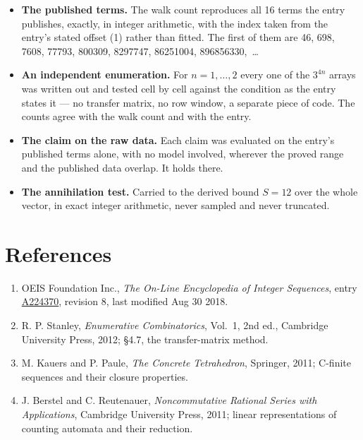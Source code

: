 \documentclass[11pt]{article}
\theoremstyle{definition}
\begin{document}
\begin{itemize}

\item {\bfseries The published terms.} The walk count reproduces all 16 terms the entry publishes, exactly, in integer arithmetic, with the index taken from the entry's stated offset (1) rather than fitted. The first of them are 46, 698, 7608, 77793, 800309, 8297747, 86251004, 896856330,~\dots

\item {\bfseries An independent enumeration.} For $n = 1,\dots,2$ every one of the $3^{4n}$ arrays was written out and tested cell by cell against the condition as the entry states it --- no transfer matrix, no row window, a separate piece of code. The counts agree with the walk count and with the entry.

\item {\bfseries The claim on the raw data.} Each claim was evaluated on the entry's published terms alone, with no model involved, wherever the proved range and the published data overlap. It holds there.

\item {\bfseries The annihilation test.} Carried to the derived bound $S = 12$ over the whole vector, in exact integer arithmetic, never sampled and never truncated.

\end{itemize}

\section{References}

\begin{enumerate}

\item OEIS Foundation Inc., \emph{The On-Line Encyclopedia of Integer Sequences}, entry \href{https://oeis.org/A224370}{A224370}, revision 8, last modified Aug 30 2018.

\item R. P. Stanley, \emph{Enumerative Combinatorics}, Vol.~1, 2nd ed., Cambridge University Press, 2012; \S4.7, the transfer-matrix method.

\item M. Kauers and P. Paule, \emph{The Concrete Tetrahedron}, Springer, 2011; C-finite sequences and their closure properties.

\item J. Berstel and C. Reutenauer, \emph{Noncommutative Rational Series with Applications}, Cambridge University Press, 2011; linear representations of counting automata and their reduction.

\end{enumerate}
\end{document}
